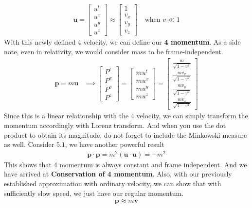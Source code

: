 \documentclass[12pt]{book}
\begin{document}
\begin{align}
\mathbf{u} = 
\begin{bmatrix}
u^t \\
u^x \\
u^y \\
u^z
\end{bmatrix}
\approx
\begin{bmatrix}
1 \\
v_x \\
v_y \\
v_z
\end{bmatrix}
\quad \text{when } v \ll 1
\end{align}
With this newly defined 4 velocity, we can define our \textbf{4 momentum}. As a side note, even in relativity, we would consider mass to be frame-independent. 
\begin{align}
\mathbf{p} = m\mathbf{u} &\implies 
\begin{bmatrix}
P^t \\
P^x \\
P^y \\
P^z
\end{bmatrix}
=
\begin{bmatrix}
mu^t \\
mu^x \\
mu^y \\
mu^z
\end{bmatrix}
=
\begin{bmatrix}
\frac{m}{\sqrt{1 - v^2}} \\
\frac{mv_x}{\sqrt{1 - v^2}} \\
\frac{mv_y}{\sqrt{1 - v^2}} \\
\frac{mv_z}{\sqrt{1 - v^2}}
\end{bmatrix}
\end{align}
Since this is a linear relationship with the 4 velocity, we can simply transform the momentum accordingly with Lorenz transform. And when you use the dot product to obtain its magnitude, do not forget to include the Minkowski measure as well. Consider $5.1$, we have another powerful result
\begin{align}
\mathbf{p}\cdot\mathbf{p} = m^2(\mathbf{u}\cdot \mathbf{u}) = -m^2
\end{align}
This shows that 4 momentum is always constant and frame independent. And we have arrived at \textbf{Conservation of 4 momentum}. Also, with our previously established approximation with ordinary velocity, we can show that with sufficiently slow speed, we just have our regular momentum.
\begin{align}
\mathbf{p} \approx m\mathbf{v}
\end{align}
\end{document}
